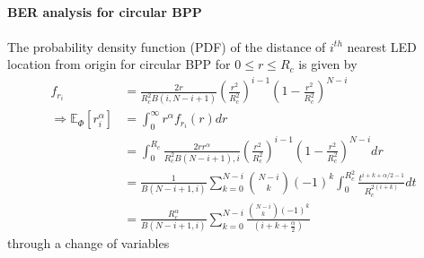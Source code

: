 \documentclass{beamer}
\providecommand{\sbrak}[1]{\ensuremath{{}\left[#1\right]}}
\providecommand{\brak}[1]{\ensuremath{\left(#1\right)}}
\theoremstyle{remark}
\begin{document}
\begin{frame}
\frametitle{\,}
\framesubtitle{
BER analysis for circular BPP
}   
The probability density function (PDF) of the distance of $i^{th}$ nearest LED location from origin for circular BPP for $0 \leq r \leq R_c$ is given by 
\begin{align}
f_{r_i}	&=
\frac{2r}{R_c^2 B\brak{i,N-i+1}}\brak{\frac{r^2}{R_c^2}}^{i-1}\brak{1-\frac{r^2}{R_c^2}}^{N-i}
\nonumber \\
%
%
 \Rightarrow  \mathbb{E}_{\Phi}\sbrak{r_i^{\alpha}} & =\int_{0}^{\infty}r^{\alpha}f_{r_i}(r)dr \nonumber \\
   & =\int_{0}^{R_c}\frac{2r r^{\alpha}}{R_c^2 B\brak{N-i+1},i} \brak{\frac{r^2}{R_c^2}}^{i-1}
   \brak{1-\frac{r^2}{R_c^2}}^{N-i} dr \nonumber \\
    & =\frac{1}{B\brak{N-i+1,i}}\sum_{k=0}^{N-i}\binom{N-i}{k}(-1)^{k}
    \int_{0}^{R_c^2}\frac{t^{i+k+\alpha/2-1}}{R_c^{2(i+k)}} dt \nonumber \\
     & =\frac{R_c^{\alpha}}{B\brak{N-i+1,i}}\sum_{k=0}^{N-i}\frac{\binom{N-i}{k}\brak{-1}^{k}}{\brak{i+k+\frac{\alpha}{2}}} 
   \end{align}
   through a change of variables 
   \end{frame}
\end{document}
